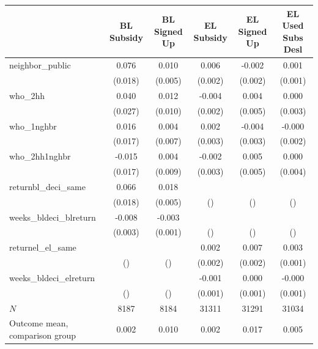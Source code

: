 \begin{tabular}{lccccc}
\hline\hline
 & BL Subsidy & BL Signed Up & EL Subsidy & EL Signed Up & EL Used Subs Desl \\
\hline
neighbor_public & 0.076 & 0.010 & 0.006 & -0.002 & 0.001 \\
 & (0.018) & (0.005) & (0.002) & (0.002) & (0.001) \\
who_2hh & 0.040 & 0.012 & -0.004 & 0.004 & 0.000 \\
 & (0.027) & (0.010) & (0.002) & (0.005) & (0.003) \\
who_1nghbr & 0.016 & 0.004 & 0.002 & -0.004 & -0.000 \\
 & (0.017) & (0.007) & (0.003) & (0.003) & (0.002) \\
who_2hh1nghbr & -0.015 & 0.004 & -0.002 & 0.005 & 0.000 \\
 & (0.017) & (0.009) & (0.003) & (0.005) & (0.004) \\
returnbl_deci_same & 0.066 & 0.018 &  &  &  \\
 & (0.018) & (0.005) & () & () & () \\
weeks_bldeci_blreturn & -0.008 & -0.003 &  &  &  \\
 & (0.003) & (0.001) & () & () & () \\
returnel_el_same &  &  & 0.002 & 0.007 & 0.003 \\
 & () & () & (0.002) & (0.002) & (0.001) \\
weeks_bldeci_elreturn &  &  & -0.001 & 0.000 & -0.000 \\
 & () & () & (0.001) & (0.001) & (0.001) \\
\hline
$N$ & 8187 & 8184 & 31311 & 31291 & 31034 \\
Outcome mean, comparison group & 0.002 & 0.010 & 0.002 & 0.017 & 0.005 \\
\hline\hline
\end{tabular}
